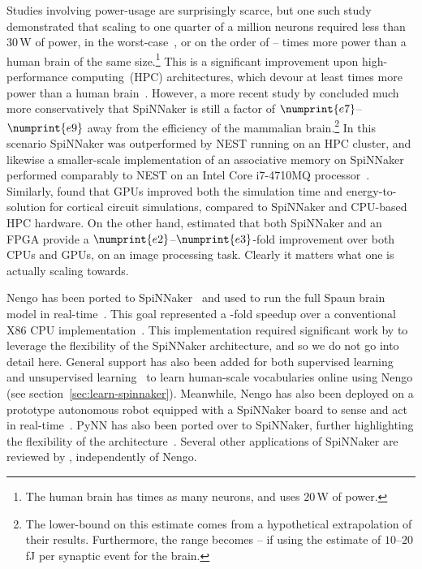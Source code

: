 Studies involving power-usage are surprisingly scarce, but one such study demonstrated that scaling to one quarter of a million neurons required less than $30$\,W of power, in the worst-case~\citep{stromatias2013power}, or on the order of -- times more power than a human brain of the same size.\footnote{
The human brain has  times as many neurons, and uses $20$\,W of power.}
This is a significant improvement upon high-performance computing~(HPC) architectures, which devour at least  times more power than a human brain~\citep{furber2012build}. 
However, a more recent study by \citet{van2018performance} concluded much more conservatively that SpiNNaker is still a factor of $\numprint{e7}$--$\numprint{e9}$ away from the efficiency of the mammalian brain.\footnote{
The lower-bound on this estimate comes from a hypothetical extrapolation of their results. Furthermore, the range becomes -- if using the estimate of $10$--$20$\,fJ per synaptic event for the brain.}
In this scenario SpiNNaker was outperformed by NEST running on an HPC cluster, and likewise a smaller-scale implementation of an associative memory on SpiNNaker performed comparably to NEST on an Intel Core i7-4710MQ processor~\citep{stockel2017binary}.
Similarly, \citet{knight2018gpus} found that GPUs improved both the simulation time and energy-to-solution for cortical circuit simulations, compared to SpiNNaker and CPU-based HPC hardware.
On the other hand, \citet{sugiarto2016high} estimated that both SpiNNaker and an FPGA provide a $\numprint{e2}$--$\numprint{e3}$-fold improvement over both CPUs and GPUs, on an image processing task. 
Clearly it matters what one is actually scaling towards.

Nengo has been ported to SpiNNaker~\citep{galluppi2012real, mundy2015} and used to run the full Spaun brain model in real-time~\citep{mundy2016real}.
This goal represented a -fold speedup over a conventional X86 CPU implementation~\citep{stewart2014large}.
This implementation required significant work by \citet{mundy2016real} to leverage the flexibility of the SpiNNaker architecture, and so we do not go into detail here.
General support has also been added for both supervised learning~\citep{davies2013} and unsupervised learning~\citep{knight2016} to learn human-scale vocabularies online using Nengo (see section~\ref{sec:learn-spinnaker}).
Meanwhile, Nengo has also been deployed on a prototype autonomous robot equipped with a SpiNNaker board to sense and act in real-time~\citep{galluppi2014}.
PyNN has also been ported over to SpiNNaker, further highlighting the flexibility of the architecture~\citep{rhodes2018spynnaker}.
Several other applications of SpiNNaker are reviewed by \citet{rhodes2018spynnaker}, independently of Nengo.

